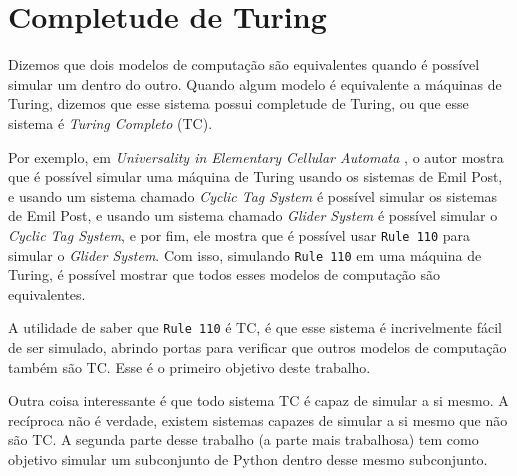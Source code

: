 \section{Completude de Turing}

Dizemos que dois modelos de computação são equivalentes
quando é possível simular um dentro do outro. Quando
algum modelo é equivalente a máquinas de Turing, dizemos
que esse sistema possui completude de Turing, ou que
esse sistema é \textit{Turing Completo} (TC).
 

Por exemplo,
em \textit{Universality in Elementary Cellular Automata}
\cite{Cook2004},
o autor mostra que é possível simular uma máquina
de Turing usando os sistemas de
Emil Post, e usando um sistema chamado \textit{Cyclic Tag System} é possível simular os sistemas de Emil Post,
e usando um sistema chamado \textit{Glider System}
é possível simular o \textit{Cyclic Tag System},
e por fim, ele mostra que é possível usar \texttt{Rule 110}
para simular o \textit{Glider System}. Com isso,
simulando \texttt{Rule 110} em uma máquina de Turing,
é possível mostrar que todos esses modelos de computação
são equivalentes.

A utilidade de saber que \texttt{Rule 110} é TC, é que esse sistema é incrivelmente
fácil de ser simulado, abrindo portas para verificar
que outros modelos de computação também são TC.
Esse é o primeiro objetivo deste trabalho.

Outra coisa interessante é que todo sistema TC é capaz de
simular a si mesmo. A recíproca não é verdade, existem
sistemas capazes de simular a si mesmo que não são TC.
A segunda parte desse trabalho (a parte mais
trabalhosa) tem como objetivo simular um subconjunto de Python
dentro desse mesmo subconjunto.